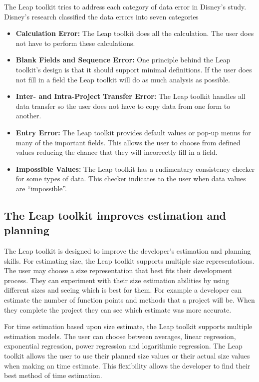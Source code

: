 The Leap toolkit tries to address each category of data error in Disney's study.
Disney's research classified the data errors into seven categories
\begin{itemize}
\item{{\bf Calculation Error:} The Leap toolkit does all the calculation.  The
    user does not have to perform these calculations.}
\item{{\bf Blank Fields and Sequence Error:} One principle behind the Leap
    toolkit's design is that it should support minimal definitions. If the user
    does not fill in a field the Leap toolkit will do as much analysis as
    possible.}
\item{{\bf Inter- and Intra-Project Transfer Error:} The Leap toolkit handles
    all data transfer so the user does not have to copy data from one form to
    another.}
\item{{\bf Entry Error:} The Leap toolkit provides default values or pop-up
    menus for many of the important fields. This allows the user to choose from
    defined values reducing the chance that they will incorrectly fill in a
    field.}
\item{{\bf Impossible Values:} The Leap toolkit has a rudimentary consistency
    checker for some types of data.  This checker indicates to the user when
    data values are ``impossible''.}
\end{itemize}

\subsection{The Leap toolkit improves estimation and planning}

The Leap toolkit is designed to improve the developer's estimation and planning 
skills.  For estimating size, the Leap toolkit supports multiple size
representations. The user may choose a size representation that best fits their 
development process.  They can experiment with their size estimation abilities
by using different sizes and seeing which is best for them. For example a
developer can estimate the number of function points and methods that a project 
will be.  When they complete the project they can see which estimate was more
accurate. 

For time estimation based upon size estimate, the Leap toolkit supports
multiple estimation models.  The user can choose between averages, linear
regression, exponential regression, power regression and logarithmic
regression.  The Leap toolkit allows the user to use their planned size values
or their actual size values when making an time estimate.  This flexibility
allows the developer to find their best method of time estimation.

